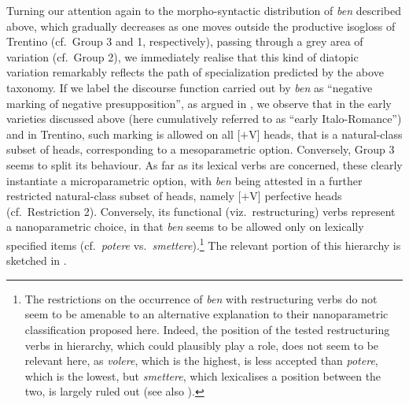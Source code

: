 \documentclass[output=paper]{langsci/langscibook}
\begin{document}
Turning our attention again to the morpho-syntactic distribution of \emph{ben}
described above, which gradually decreases as one moves outside the productive
isogloss of Trentino (cf.\ Group 3 and 1, respectively), passing through a grey
area of variation (cf.\ Group 2), we immediately realise that this kind of
diatopic variation remarkably reflects the path of specialization predicted by
the above taxonomy. If we label the discourse function carried out by
\emph{ben} as \enquote{negative marking of negative presupposition}, as argued in
\textcite{CognSchi2018b}, we observe that in the early varieties discussed
above (here cumulatively referred to as \enquote{early Italo-Romance}) and in Trentino,
such marking is allowed on all [$+$V] heads, that is a natural-class subset of
heads, corresponding to a mesoparametric option. Conversely, Group 3 seems to
split its behaviour. As far as its lexical verbs are concerned, these clearly
instantiate a microparametric option, with \emph{ben} being attested in a
further restricted natural-class subset of heads, namely [$+$V] perfective heads
(cf.\ Restriction 2). Conversely, its functional (viz.\ restructuring) verbs
represent a nanoparametric choice, in that \emph{ben} seems to be allowed only
on lexically specified items (cf.\ \emph{potere} vs.\
\emph{smettere}).\footnote{The restrictions on the occurrence of \emph{ben} with
    restructuring verbs do not seem to be amenable to an alternative
    explanation to their nanoparametric classification proposed here. Indeed,
    the position of the tested restructuring verbs in \citegen{Cinque2006}
    hierarchy, which could plausibly play a role, does not seem to be relevant
    here, as \emph{volere}, which is the highest, is less accepted than
    \emph{potere}, which is the lowest, but \emph{smettere}, which lexicalises
    a position between the two, is largely ruled out (see also
\citealt{CognSchi2018}).} The relevant portion of this hierarchy is sketched
in \figref{ex:schifano:12.15}.
\end{document}
